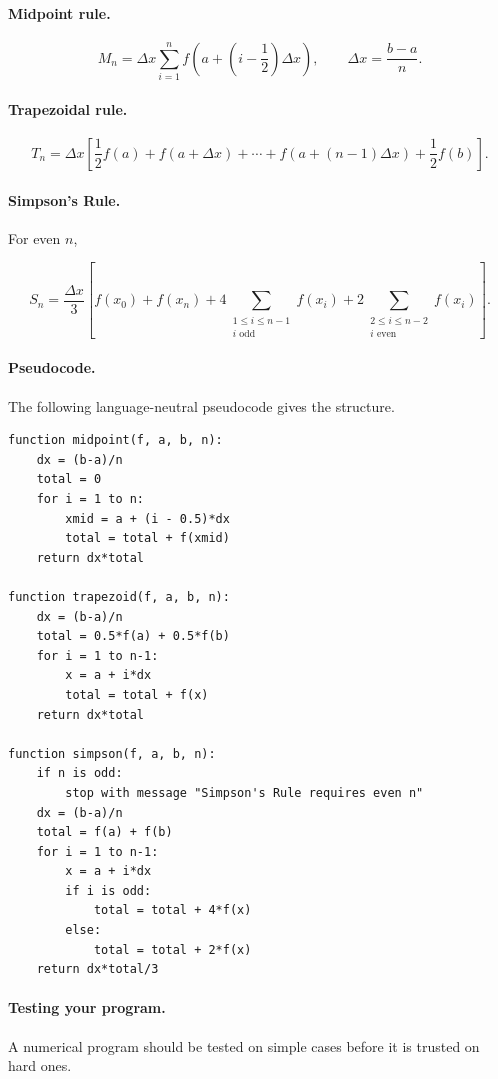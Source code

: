 \paragraph{Midpoint rule.}

\[
M_n=\Delta x\sum_{i=1}^{n} f\left(a+\left(i-\frac12\right)\Delta x\right),
\qquad
\Delta x=\frac{b-a}{n}.
\]

\paragraph{Trapezoidal rule.}

\[
T_n=\Delta x\left[
\frac12f(a)+f(a+\Delta x)+\cdots+f(a+(n-1)\Delta x)+\frac12f(b)
\right].
\]

\paragraph{Simpson's Rule.}
For even \(n\),

\[
S_n=
\frac{\Delta x}{3}
\left[
f(x_0)+f(x_n)
+
4\sum_{\substack{1\le i\le n-1\\ i\text{ odd}}}f(x_i)
+
2\sum_{\substack{2\le i\le n-2\\ i\text{ even}}}f(x_i)
\right].
\]

\paragraph{Pseudocode.}
The following language-neutral pseudocode gives the structure.

\begin{verbatim}
function midpoint(f, a, b, n):
    dx = (b-a)/n
    total = 0
    for i = 1 to n:
        xmid = a + (i - 0.5)*dx
        total = total + f(xmid)
    return dx*total

function trapezoid(f, a, b, n):
    dx = (b-a)/n
    total = 0.5*f(a) + 0.5*f(b)
    for i = 1 to n-1:
        x = a + i*dx
        total = total + f(x)
    return dx*total

function simpson(f, a, b, n):
    if n is odd:
        stop with message "Simpson's Rule requires even n"
    dx = (b-a)/n
    total = f(a) + f(b)
    for i = 1 to n-1:
        x = a + i*dx
        if i is odd:
            total = total + 4*f(x)
        else:
            total = total + 2*f(x)
    return dx*total/3
\end{verbatim}

\paragraph{Testing your program.}
A numerical program should be tested on simple cases before it is trusted on hard ones.

